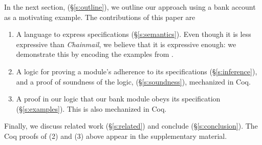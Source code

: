 In the next section, (\S\ref{s:outline}),  we outline our approach using a
bank account as  a motivating example. 
%
The contributions of this paper are\begin{enumerate}
 \item
A language to
express \Nec specifications (\S\ref{s:semantics}). Even though it is
less expressive than  \emph{Chainmail}, we believe that it is expressive enough: we demonstrate this
by encoding the examples from \cite{FASE}.
 \item
A logic for proving a module's adherence to its
 \Nec specifications (\S\ref{s:inference}), and a proof of soundness of the logic, (\S\ref{s:soundness}),
 mechanized in Coq. 
 \item
A proof in our logic %
  that our bank module obeys its \Nec specification (\S\ref{s:examples}). This is also mechanized in Coq.
\end{enumerate}
 
 
 


\noindent Finally, we discuss %
 related work (\S\ref{s:related}) and conclude (\S\ref{s:conclusion}).
The Coq proofs of 
(2) and (3) above %
appear in the
supplementary material.

